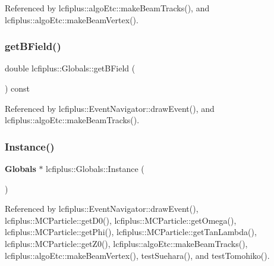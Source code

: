 Referenced by lcfiplus\+::algo\+Etc\+::make\+Beam\+Tracks(), and lcfiplus\+::algo\+Etc\+::make\+Beam\+Vertex().

\mbox{\label{classlcfiplus_1_1Globals_afd5a7729758f86544a43d8b977e9743a}} 
\subsubsection{get\+B\+Field()}
{\footnotesize\ttfamily double lcfiplus\+::\+Globals\+::get\+B\+Field (\begin{DoxyParamCaption}{ }\end{DoxyParamCaption}) const\hspace{0.3cm}{\ttfamily [inline]}}



Referenced by lcfiplus\+::\+Event\+Navigator\+::draw\+Event(), and lcfiplus\+::algo\+Etc\+::make\+Beam\+Tracks().

\mbox{\label{classlcfiplus_1_1Globals_a39d3b47f0a7d8ddf31ff47106ff65b19}} 
\subsubsection{Instance()}
{\footnotesize\ttfamily \textbf{ Globals} $\ast$ lcfiplus\+::\+Globals\+::\+Instance (\begin{DoxyParamCaption}{ }\end{DoxyParamCaption})\hspace{0.3cm}{\ttfamily [static]}}



Referenced by lcfiplus\+::\+Event\+Navigator\+::draw\+Event(), lcfiplus\+::\+M\+C\+Particle\+::get\+D0(), lcfiplus\+::\+M\+C\+Particle\+::get\+Omega(), lcfiplus\+::\+M\+C\+Particle\+::get\+Phi(), lcfiplus\+::\+M\+C\+Particle\+::get\+Tan\+Lambda(), lcfiplus\+::\+M\+C\+Particle\+::get\+Z0(), lcfiplus\+::algo\+Etc\+::make\+Beam\+Tracks(), lcfiplus\+::algo\+Etc\+::make\+Beam\+Vertex(), test\+Suehara(), and test\+Tomohiko().

\mbox{\label{classlcfiplus_1_1Globals_a6e81080658e551e9125c945543e6e99b}} 
